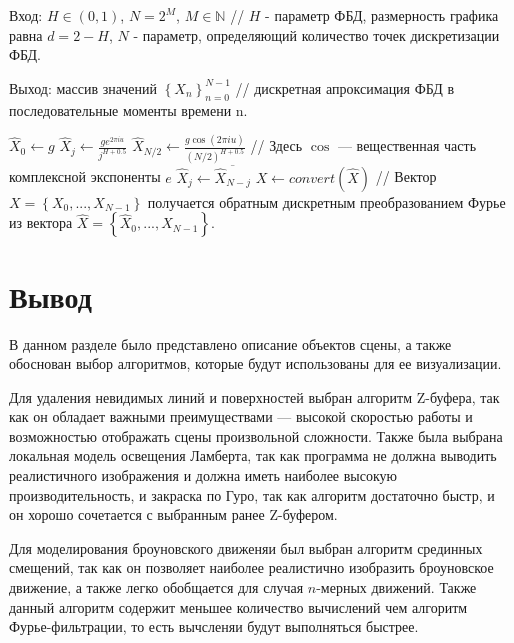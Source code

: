 Вход: $H \in (0,1)$, $N=2^M$, $M \in \mathbb{N}$ // $H$ - параметр ФБД, размерность графика равна $d = 2 - H$, $N$ - параметр, определяющий количество точек дискретизации ФБД.

Выход: массив значений $\left\{X_n\right\}_{n=0}^{N-1}$ // дискретная апроксимация ФБД в последовательные моменты времени n.

\begin{algorithmic}[1]
	\State $\hat{X}_0\gets g$
	\State $\hat{X}_j \gets \frac{ge^{2\pi iu}}{j^{H+0.5}}$
	\EndFor
	\State $\hat{X}_{N/2} \gets \frac{g\cos(2\pi iu)}{(N/2)^{H+0.5}}$ // Здесь $\cos$ — вещественная часть комплексной экспоненты $e$
	\State $\hat{X}_j \gets \overline{\hat{X}_{N-j}}$
	\EndFor
	\State $X \gets convert(\hat{X})$ // Вектор $X = \left\{X_0,...,X_{N-1}\right\}$ получается обратным дискретным преобразованием Фурье из вектора $\hat{X} = \left\{\hat{X}_0,...,\hat{X}_{N-1}\right\}$.
\end{algorithmic}

\section*{Вывод}
В данном разделе было представлено описание объектов сцены, а также обоснован выбор алгоритмов, которые будут использованы для ее визуализации.

Для удаления невидимых линий и поверхностей выбран алгоритм Z-буфера, так как он обладает важными преимуществами --- высокой скоростью работы и возможностью отображать сцены произвольной сложности.
Также была выбрана локальная модель освещения Ламберта, так как программа не должна выводить реалистичного изображения и должна иметь наиболее высокую производительность, и закраска по Гуро, так как алгоритм достаточно быстр, и он хорошо сочетается с выбранным ранее Z-буфером.

Для моделирования броуновского движеняи был выбран алгоритм срединных смещений, так как он позволяет наиболее реалистично изобразить броуновское движение, а также легко обобщается для случая $n$-мерных движений. Также данный алгоритм содержит меньшее количество вычислений чем алгоритм Фурье-фильтрации, то есть вычсленяи будут выполняться быстрее. 
